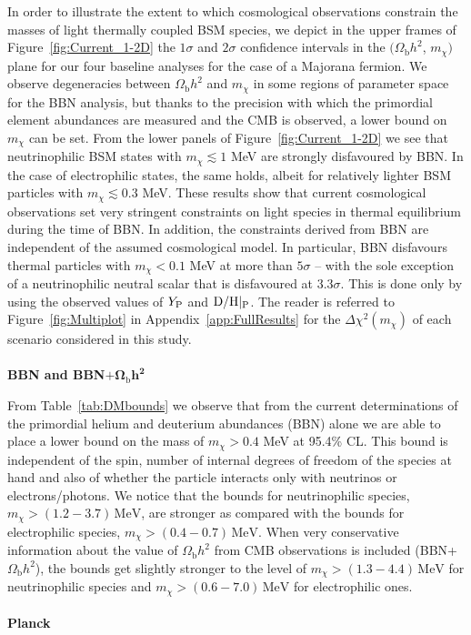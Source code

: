 \documentclass[notitlepage,letterpaper,natbib,aps,prd,onecolumn,amsmath,amsfonts,nofootinbib,preprintnumbers,superscriptaddress,secnumarabic,groupedaddress]{revtex4-1}
\begin{document}
In order to illustrate the extent to which cosmological observations constrain the masses of light thermally coupled BSM species, we depict in the upper frames of Figure~\ref{fig:Current_1-2D} the $1\sigma$ and $2\sigma$ confidence intervals in the $(\Omega_\mathrm{b}h^2$, $m_\chi)$ plane for our four baseline analyses for the case of a Majorana fermion. We observe degeneracies between $\Omega_\mathrm{b}h^2$ and $m_\chi$ in some regions of parameter space for the BBN analysis, but thanks to the precision with which the primordial element abundances are measured and the CMB is observed, a lower bound on $m_\chi$ can be set. From the lower panels of Figure~\ref{fig:Current_1-2D} we see that neutrinophilic BSM states with $m_\chi \lesssim 1$ MeV are strongly disfavoured by BBN. In the case of electrophilic states, the same holds, albeit for relatively lighter BSM particles with $m_\chi \lesssim 0.3$ MeV. These results show that current cosmological observations set very stringent constraints on light species in thermal equilibrium during the time of BBN. In addition, the constraints derived from BBN are independent of the assumed cosmological model. In particular, BBN disfavours thermal particles with $m_\chi < 0.1$ MeV at more than $5\sigma$ -- with the sole exception of a neutrinophilic neutral scalar that is disfavoured at $3.3\sigma$. This is done only by using the observed values of $Y_{\rm P}$ and ${\rm D/H}|_{\rm P}$. The reader is referred to Figure~\ref{fig:Multiplot} in Appendix~\ref{app:FullResults} for the $\Delta \chi^2 (m_\chi)$ of each scenario considered in this study.\\\\
\newpage
\vspace*{-1.2cm}
\textbf{BBN and BBN}$\boldsymbol{+\Omega_\mathrm{b}h^2}$

From Table~\ref{tab:DMbounds} we observe that from the current determinations of the primordial helium and deuterium abundances (BBN) alone we are able to place a lower bound on the mass of $m_\chi >0.4$ MeV at 95.4\% CL. This bound is independent of the spin, number of internal degrees of freedom of the species at hand and also of whether the particle interacts only with neutrinos or electrons/photons. We notice that the bounds for neutrinophilic species, $m_\chi > (1.2-3.7)\,\text{MeV}$, are stronger as compared with the bounds for electrophilic species, $m_\chi > (0.4-0.7)\,\text{MeV}$. When very conservative information about the value of $\Omega_\mathrm{b}h^2$ from CMB observations is included (BBN+$\Omega_\mathrm{b}h^2$), the bounds get slightly stronger to the level of $m_\chi > (1.3-4.4)\,\text{MeV}$ for neutrinophilic species and $m_\chi > (0.6-7.0)\,\text{MeV}$ for electrophilic ones.\\\\
\textbf{Planck} 
\end{document}
